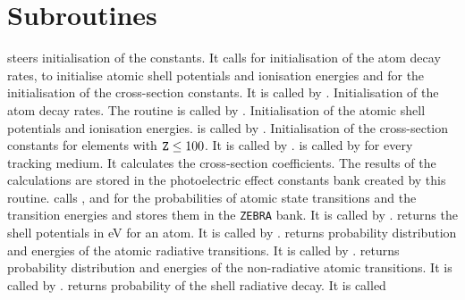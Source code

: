               
\section{Subroutines}
 steers initialisation of the constants. It calls 
for initialisation of the atom decay rates,  to initialise
atomic shell potentials and ionisation energies and  for the 
initialisation of the cross-section constants. It is called by .
Initialisation of the atom decay rates. The routine is called by .
Initialisation of the atomic shell potentials and ionisation energies.
 is called by .
Initialisation of the cross-section constants for elements with
${\tt Z} \leq  100$. It is called by .
 is called by  for every tracking medium.
It calculates the cross-section coefficients.
The results of the calculations are stored in
the photoelectric effect constants bank created by this routine.
 calls ,  and  for the
probabilities of atomic state transitions and the transition energies
and stores them in the {\tt ZEBRA} bank. It is called by .
 returns the shell potentials in eV for an atom.
It is called by .
 returns probability distribution and energies of the atomic
radiative transitions. It is called by .
 returns probability distribution and energies of the non-radiative
atomic transitions. It is called by .
 returns probability of the shell radiative decay. It is called
